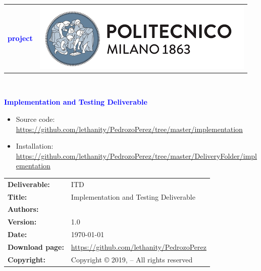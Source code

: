 




\begin{titlepage}



{\begin{table}[t!]
\centering
\begin{tabu} to \textwidth { X[1.3,r,p] X[1.7,l,p] }
\textcolor{Blue}
{\textbf{\small{\projectName{} project \newline \names{}}}} & \includegraphics[scale=0.5]{Images/PolimiLogo}
\end{tabu}
\end{table}}~\\ [7cm]


\begin{flushleft}

{\textcolor{Blue}{\textbf{\Huge{Implementation and Testing Deliverable}}}} \\ [1cm]

\end{flushleft}

\vspace{9cm}
\begin{itemize}[label={{}}]  \itemsep0em
        \item Source code: \url{https://github.com/lethanity/PedrozoPerez/tree/master/implementation}
        \item Installation: \url{https://github.com/lethanity/PedrozoPerez/tree/master/DeliveryFolder/implementation}
\end{itemize}

\end{titlepage}

\begin{table}[h!]
\begin{tabu} to \textwidth { X[0.3,r,p] X[0.7,l,p] }
\hline

\textbf{Deliverable:} & ITD\\
\textbf{Title:} & Implementation and Testing Deliverable \\
\textbf{Authors:} & \names{} \\
\textbf{Version:} & 1.0 \\ 
\textbf{Date:} & \today \\
\textbf{Download page:} & \url{https://github.com/lethanity/PedrozoPerez} \\
\textbf{Copyright:} & Copyright © 2019, \names{}  – All rights reserved \\
\hline
\end{tabu}
\end{table}




